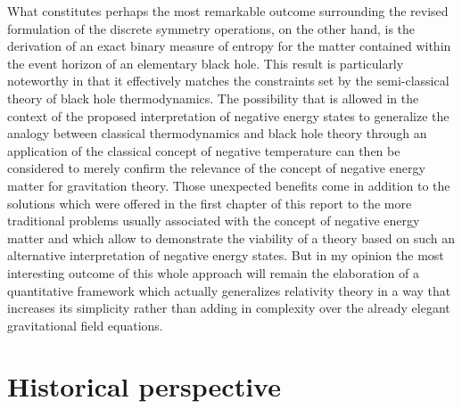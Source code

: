 \documentclass[notitlepage,12pt]{report}
\begin{document}
What constitutes perhaps the most remarkable outcome surrounding the revised formulation of the discrete symmetry operations, on the other hand, is the derivation of an exact binary measure of entropy for the matter contained within the event horizon of an elementary black hole. This result is particularly noteworthy in that it effectively matches the constraints set by the semi-classical theory of black hole thermodynamics. The possibility that is allowed in the context of the proposed interpretation of negative energy states to generalize the analogy between classical thermodynamics and black hole theory through an application of the classical concept of negative temperature can then be considered to merely confirm the relevance of the concept of negative energy matter for gravitation theory. Those unexpected benefits come in addition to the solutions which were offered in the first chapter of this report to the more traditional problems usually associated with the concept of negative energy matter and which allow to demonstrate the viability of a theory based on such an alternative interpretation of negative energy states. But in my opinion the most interesting outcome of this whole approach will remain the elaboration of a quantitative framework which actually generalizes relativity theory in a way that increases its simplicity rather than adding in complexity over the already elegant gravitational field equations.

\section{Historical perspective}
\end{document}
